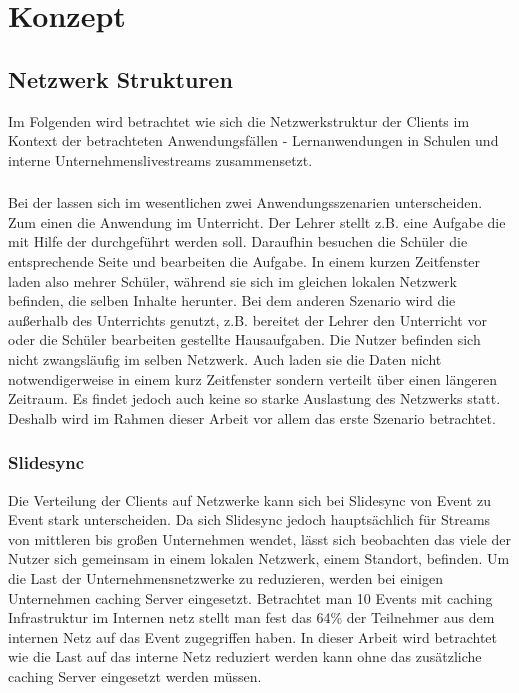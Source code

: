 \chapter{Konzept}\label{ch:concept}
%


\section{Netzwerk Strukturen}
Im Folgenden wird betrachtet wie sich die Netzwerkstruktur der Clients im Kontext der betrachteten Anwendungsfällen - Lernanwendungen in Schulen und interne Unternehmenslivestreams zusammensetzt.
\subsection{\schulCloud}
Bei der \schulCloud lassen sich im wesentlichen zwei Anwendungsszenarien unterscheiden. Zum einen die Anwendung im Unterricht. Der Lehrer stellt z.B. eine Aufgabe die mit Hilfe der \schulCloud durchgeführt werden soll. Daraufhin besuchen die Schüler die entsprechende Seite und bearbeiten die Aufgabe. In einem kurzen Zeitfenster laden also mehrer Schüler, während sie sich im gleichen lokalen Netzwerk befinden, die selben Inhalte herunter. Bei dem anderen Szenario wird die \schulCloud außerhalb des Unterrichts genutzt, z.B. bereitet der Lehrer den Unterricht vor oder die Schüler bearbeiten gestellte Hausaufgaben. Die Nutzer befinden sich nicht zwangsläufig im selben Netzwerk. Auch laden sie die Daten nicht notwendigerweise in einem kurz Zeitfenster sondern verteilt über einen längeren Zeitraum. Es findet jedoch auch keine so starke Auslastung des Netzwerks statt. Deshalb wird im Rahmen dieser Arbeit vor allem das erste Szenario betrachtet.

\subsection{Slidesync}
Die Verteilung der Clients auf Netzwerke kann sich bei Slidesync von Event zu Event stark unterscheiden. Da sich Slidesync jedoch hauptsächlich für Streams von mittleren bis großen Unternehmen wendet, lässt sich beobachten das viele der Nutzer sich gemeinsam in einem lokalen Netzwerk, einem Standort, befinden. Um die Last der Unternehmensnetzwerke zu reduzieren, werden bei einigen Unternehmen caching Server eingesetzt. Betrachtet man 10 Events mit caching Infrastruktur im Internen netz stellt man fest das 64\% der Teilnehmer aus dem internen Netz auf das Event zugegriffen haben. In dieser Arbeit wird betrachtet wie die Last auf das interne Netz reduziert werden kann ohne das zusätzliche caching Server eingesetzt werden müssen.

